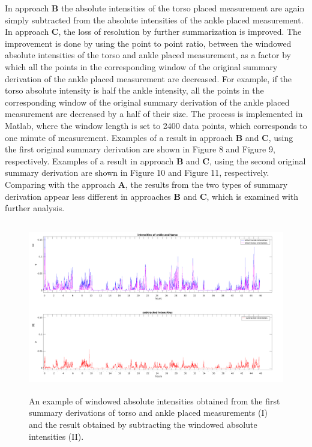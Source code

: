 \documentclass{article}
\begin{document}
{In approach \textbf{B} the absolute intensities of the torso placed measurement are again simply subtracted from the absolute intensities of the ankle placed measurement. In approach \textbf{C}, the loss of resolution by further summarization is improved. The improvement is done by using the point to point ratio, between the windowed absolute intensities of the torso and ankle placed measurement, as a factor by which all the points in the corresponding window of the original summary derivation of the ankle placed measurement are decreased. For example, if the torso absolute intensity is half the ankle intensity, all the points in the corresponding window of the original summary derivation of the ankle placed measurement are decreased by a half of their size. The process is implemented in Matlab, where the window length is set to 2400 data points, which corresponds to one minute of measurement. Examples of a result in approach \textbf{B} and \textbf{C}, using the first original summary derivation are shown in Figure 8 and Figure 9, respectively. Examples of a result in approach \textbf{B} and \textbf{C}, using the second original summary derivation are shown in Figure 10 and Figure 11, respectively. Comparing with the approach \textbf{A}, the results from the two types of summary derivation appear less different in approaches \textbf{B} and \textbf{C}, which is examined with further analysis. 
\begin{figure}[h!]
\includegraphics[width=15cm, height=7.5cm]{subtractedIntensities.png}
\caption{An example of windowed absolute intensities obtained from the first summary derivations of torso and ankle placed measurements (I) and the result obtained by subtracting the windowed absolute intensities (II).}
\end{figure}
\begin{figure}[h!]

\end{figure}}
\end{document}
